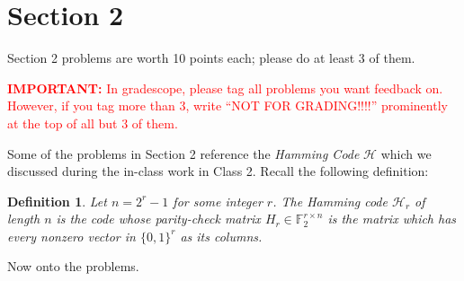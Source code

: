 \documentclass{article}
\newcommand{\F}{\mathbb{F}}
\newcommand{\cH}{\mathcal{H}}
\newtheorem{definition}{Definition}
\begin{document}
\section*{Section 2}
\setcounter{section}{2}
Section 2 problems are worth 10 points each; please do at least 3 of them.  

\vspace{.5cm}
\noindent
\textcolor{red}{
\textbf{IMPORTANT:} In gradescope, please tag all problems you want feedback on.  However, if you tag more than 3, write ``NOT FOR GRADING!!!!'' prominently at the top of all but 3 of them.  }

\vspace{.5cm}

Some of the problems in Section 2 reference the \emph{Hamming Code} $\mathcal{H}$ which we discussed during the in-class work in Class 2.  
Recall the following definition:
\begin{definition} Let $n = 2^r - 1$ for some integer $r$.  The Hamming code $\cH_r$ of length $n$ is the code whose parity-check matrix $H_r \in \F_2^{r \times n}$ is the matrix which has every nonzero vector in $\{0,1\}^r$ as its columns.
\end{definition}

Now onto the problems.
\end{document}
